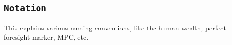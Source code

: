\documentclass[titlepage,abstract]{\econtex}
\begin{document}
\subsection{\texttt{Notation}}
This explains various naming conventions, like the human wealth, perfect-foresight marker, MPC, etc.

%
%
%

\end{document}
